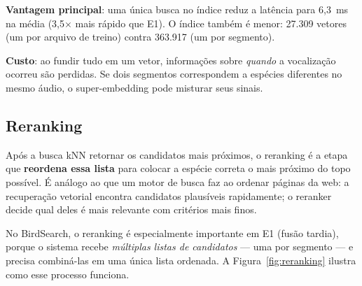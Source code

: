 \documentclass[12pt]{article}
\begin{document}
\textbf{Vantagem principal}: uma única busca no índice reduz a latência para
6,3~ms na média (3,5$\times$ mais rápido que E1). O índice também é menor:
27.309 vetores (um por arquivo de treino) contra 363.917 (um por segmento).

\textbf{Custo}: ao fundir tudo em um vetor, informações sobre \emph{quando}
a vocalização ocorreu são perdidas. Se dois segmentos correspondem a espécies
diferentes no mesmo áudio, o super-embedding pode misturar seus sinais.

\subsection{Reranking}
\label{sub:reranking}

Após a busca kNN retornar os candidatos mais próximos, o reranking é a etapa
que \textbf{reordena essa lista} para colocar a espécie correta o mais próximo
do topo possível. É análogo ao que um motor de busca faz ao ordenar páginas
da web: a recuperação vetorial encontra candidatos plausíveis rapidamente;
o reranker decide qual deles é mais relevante com critérios mais finos.

No BirdSearch, o reranking é especialmente importante em E1 (fusão tardia),
porque o sistema recebe \emph{múltiplas listas de candidatos} --- uma por
segmento --- e precisa combiná-las em uma única lista ordenada.
A Figura~\ref{fig:reranking} ilustra como esse processo funciona.
\end{document}

